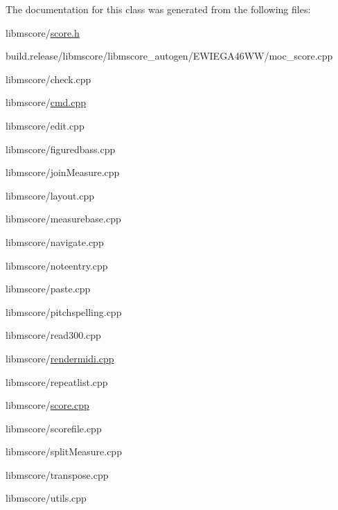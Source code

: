 The documentation for this class was generated from the following files\+:\begin{DoxyCompactItemize}
\item 
libmscore/\hyperlink{score_8h}{score.\+h}\item 
build.\+release/libmscore/libmscore\+\_\+autogen/\+E\+W\+I\+E\+G\+A46\+W\+W/moc\+\_\+score.\+cpp\item 
libmscore/check.\+cpp\item 
libmscore/\hyperlink{cmd_8cpp}{cmd.\+cpp}\item 
libmscore/edit.\+cpp\item 
libmscore/figuredbass.\+cpp\item 
libmscore/join\+Measure.\+cpp\item 
libmscore/layout.\+cpp\item 
libmscore/measurebase.\+cpp\item 
libmscore/navigate.\+cpp\item 
libmscore/noteentry.\+cpp\item 
libmscore/paste.\+cpp\item 
libmscore/pitchspelling.\+cpp\item 
libmscore/read300.\+cpp\item 
libmscore/\hyperlink{rendermidi_8cpp}{rendermidi.\+cpp}\item 
libmscore/repeatlist.\+cpp\item 
libmscore/\hyperlink{score_8cpp}{score.\+cpp}\item 
libmscore/scorefile.\+cpp\item 
libmscore/split\+Measure.\+cpp\item 
libmscore/transpose.\+cpp\item 
libmscore/utils.\+cpp\end{DoxyCompactItemize}
